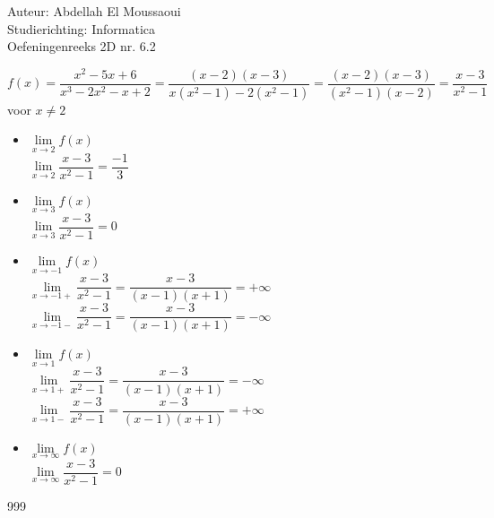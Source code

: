 \documentclass[a4paper]{article}
\begin{document}
  
\noindent \large Auteur: Abdellah El Moussaoui \\
\noindent \large Studierichting: Informatica\\
\noindent \large Oefeningenreeks 2D nr. 6.2\\

\medskip

\normalsize


$f(x)=\dfrac{x^2-5x+6}{x^3-2x^2-x+2} = \dfrac{\left(x-2\right)\left(x-3\right)}{x\left(x^2-1\right)-2\left(x^2-1\right)} = \dfrac{\left(x-2\right)\left(x-3\right)}{\left(x^2-1\right)\left(x-2\right)} = \dfrac{x-3}{x^2-1}$ voor $x\neq2$\\

\begin{itemize}
    \item $\lim\limits_{x\to2} f(x)$\\

    $ \lim\limits_{x\to2}\dfrac{x-3}{x^2-1} = \dfrac{-1}{3}$\\

    \item $\lim\limits_{x\to3} f(x)$\\

    $ \lim\limits_{x\to3}\dfrac{x-3}{x^2-1} = 0$\\

    \item $\lim\limits_{x\to-1} f(x)$\\

    $ \lim\limits_{x\to-1+}\dfrac{x-3}{x^2-1} = \dfrac{x-3}{\left(x-1\right)\left(x+1\right)}=+\infty$\\

    $ \lim\limits_{x\to-1-}\dfrac{x-3}{x^2-1} = \dfrac{x-3}{\left(x-1\right)\left(x+1\right)}=-\infty$\\

    \item $\lim\limits_{x\to1} f(x)$\\

    $ \lim\limits_{x\to1+}\dfrac{x-3}{x^2-1} = \dfrac{x-3}{\left(x-1\right)\left(x+1\right)}=-\infty$\\

    $ \lim\limits_{x\to1-}\dfrac{x-3}{x^2-1} = \dfrac{x-3}{\left(x-1\right)\left(x+1\right)}=+\infty$\\

    \item $\lim\limits_{x\to \infty} f(x)$\\

    $ \lim\limits_{x\to \infty}\dfrac{x-3}{x^2-1} = 0$\\
\end{itemize} 


\begin{thebibliography}{999}
\end{thebibliography}
\end{document}
